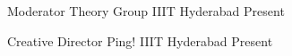 
\begin{cventries}
  \cventry
    {Moderator} %
    {Theory Group} %
    {IIIT Hyderabad} %
    {Present} %
    {
    }

  \cventry
    {Creative Director} %
    {Ping!} %
    {IIIT Hyderabad} %
    {Present} %
    {
    }
\end{cventries}
